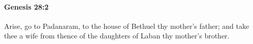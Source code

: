 
		\paragraph{Genesis 28:2} %
			\label{GENESIS-28-2}

			Arise, go to Padanaram, to the house of Bethuel thy mother's father; and take thee a wife from thence of the daughters of Laban thy mother's brother.


